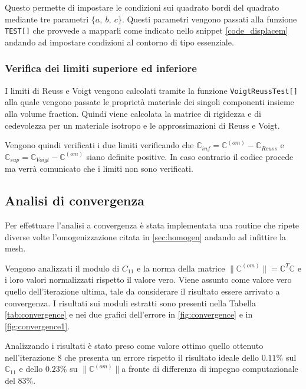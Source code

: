 \documentclass[a4paper,num-refs]{oup-contemporary}
\begin{document}
 Questo permette di impostare le condizioni sui quadrato bordi del quadrato mediante tre parametri $\{a,\:b,\:c\}$. Questi parametri vengono passati alla funzione \texttt{TEST[]} che provvede a mapparli come indicato nello snippet  \ref{code_displacem} andando ad impostare condizioni al contorno di tipo essenziale.  

\subsubsection{Verifica dei limiti superiore ed inferiore}

I limiti di Reuss e Voigt vengono calcolati tramite la funzione \texttt{VoigtReussTest[]} alla quale vengono passate le proprietà materiale dei singoli componenti insieme alla volume fraction. Quindi viene calcolata la matrice di rigidezza e di cedevolezza per un materiale isotropo e le approssimazioni di Reuss e Voigt. 

Vengono quindi verificati i due limiti verificando che $\mathbb C_{inf}=\mathbb C^{(om)}-\mathbb C_{Reuss} $ e $\mathbb C_{sup}=\mathbb C_{Voigt} - \mathbb C^{(om)}$ siano definite positive. In caso contrario il codice procede ma verrà comunicato che i limiti non sono verificati. 

\subsection{Analisi di convergenza}
\label{sec:convergenza}

Per effettuare l'analisi a convergenza è stata implementata una routine che ripete diverse volte l'omogenizzazione citata in \cref{sec:homogen} andando ad infittire la mesh. 

Vengono analizzati il modulo di $C_{11}$ e la norma della matrice $\| \mathbb C^{(om)}\|=\mathbb C^T\mathbb C$ e i loro valori normalizzati rispetto il valore vero. Viene assunto come valore vero quello dell'iterazione ultima, tale da considerare il risultato essere arrivato a convergenza. 
I risultati sui moduli estratti sono presenti nella Tabella \ref{tab:convergence} e nei due grafici dell'errore in \cref{fig:convergence} e in \cref{fig:convergence1}.

Analizzando i risultati è stato preso come valore ottimo quello ottenuto nell'iterazione 8 che presenta un errore rispetto il risultato ideale dello $0.11\%$ sul $\mathbb C_{11}$ e dello $0.23\%$ su $\|\mathbb C^{(om)}\|$a fronte di differenza di impegno computazionale del $83\%$. 
\end{document}
